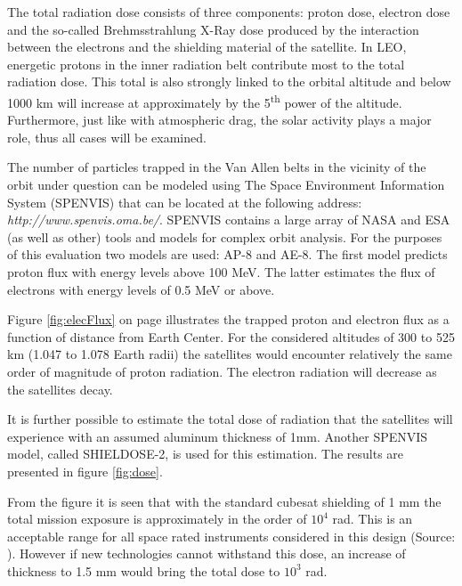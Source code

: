 The total radiation dose consists of three components: proton dose, electron dose and the so-called Brehmsstrahlung X-Ray dose produced by the interaction between the electrons and the shielding material of the satellite. In \ac{LEO}, energetic protons in the inner radiation belt contribute most to the total radiation dose. This total is also strongly linked to the orbital altitude and below 1000 km will increase at approximately by the 5\textsuperscript{th} power of the altitude. Furthermore, just like with atmospheric drag, the solar activity plays a major role, thus all cases will be examined.

The number of particles trapped in the Van Allen belts in the vicinity of the orbit under question can be modeled using The Space Environment Information System (SPENVIS) that can be located at the following address: \emph{http://www.spenvis.oma.be/}. SPENVIS contains a large array of NASA and ESA (as well as other) tools and models for complex orbit analysis. For the purposes of this evaluation two models are used: AP-8 and AE-8. The first model predicts proton flux with energy levels above 100 MeV. The latter estimates the flux of electrons with energy levels of 0.5 MeV or above.

Figure \ref{fig:elecFlux} on page \pageref{fig:elecFlux} illustrates the trapped proton and electron flux as a function of distance from Earth Center. For the considered altitudes of 300 to 525 km (1.047 to 1.078 Earth radii) the satellites would encounter relatively the same order of magnitude of proton radiation. The electron radiation will decrease as the satellites decay.

It is further possible to estimate the total dose of radiation that the satellites will experience with an assumed aluminum thickness of 1mm. Another SPENVIS model, called SHIELDOSE-2, is used for this estimation. The results are presented in figure \ref{fig:dose}.

From the figure it is seen that with the standard cubesat shielding of 1 mm the total mission exposure is approximately in the order of $10^4$ rad. This is an acceptable range for all space rated instruments considered in this design (Source: \cite{larson}). However if new technologies cannot withstand this dose, an increase of thickness to 1.5 mm would bring the total dose to $10^3$ rad. 

